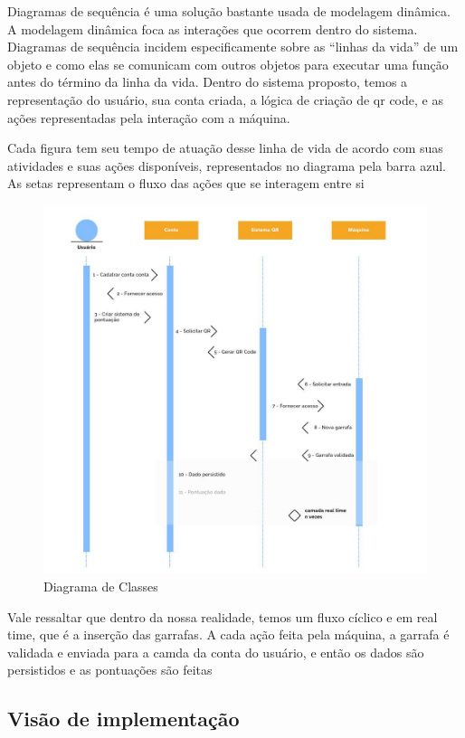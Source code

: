\begin{apendicesenv}
Diagramas de sequência é uma solução bastante usada de modelagem dinâmica. A modelagem dinâmica foca as interações que ocorrem dentro do sistema. Diagramas de sequência incidem especificamente sobre as “linhas da vida” de um objeto e como elas se comunicam com outros objetos para executar uma função antes do término da linha da vida. Dentro do sistema proposto, temos a representação do usuário, sua conta criada, a lógica de criação de qr code, e as ações representadas pela interação com a máquina. 

Cada figura tem seu tempo de atuação desse linha de vida de acordo com suas atividades e suas ações disponíveis, representados no diagrama pela barra azul. As setas representam o fluxo das ações que se interagem entre si

\begin{figure}[!ht]
	\centering
		\includegraphics[scale=0.3]{figuras/software/sequencia.jpg}
	\caption{Diagrama de Classes}
\end{figure}

Vale ressaltar que dentro da nossa realidade, temos um fluxo cíclico e em real time, que é a inserção das garrafas. A cada ação feita pela máquina, a garrafa é validada e enviada para a camda da conta do usuário, e então os dados são persistidos e as pontuações são feitas

\subsection{Visão de implementação}


\end{apendicesenv}
